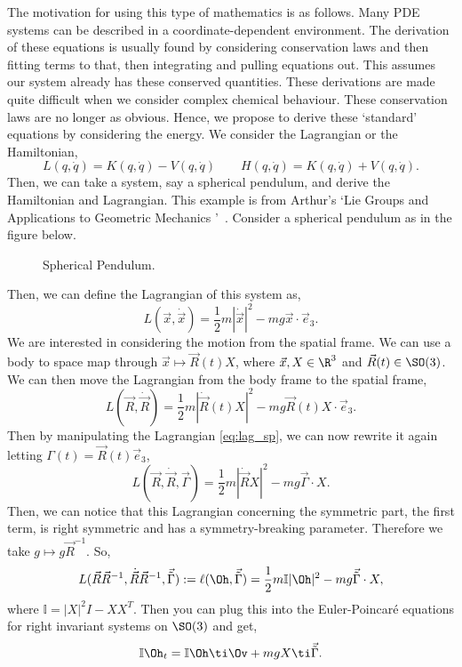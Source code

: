 \noindent
The motivation for using this type of mathematics is as follows. Many PDE systems can be described in a coordinate-dependent environment. The derivation of these equations is usually found by considering conservation laws and then fitting terms to that, then integrating and pulling equations out. This assumes our system already has these conserved quantities. These derivations are made quite difficult when we consider complex chemical behaviour. These conservation laws are no longer as obvious. Hence, we propose to derive these `standard' equations by considering the energy. We consider the Lagrangian or the Hamiltonian,
$$ L(q, \dot q) = K(q, \dot q) - V(q, \dot q) \qquad H(q, \dot q) = K(q, \dot q) + V(q, \dot q). $$
Then, we can take a system, say a spherical pendulum, and derive the Hamiltonian and Lagrangian. This example is from Arthur's `Lie Groups and Applications to Geometric Mechanics '~\cite {arthur}. Consider a spherical pendulum as in the figure below.

\begin{figure}[!ht]
\centering
\resizebox{0.6\textwidth}{!}{}
\caption{Spherical Pendulum.}
\label{fig:diffeos}
\end{figure}

\noindent
Then, we can define the Lagrangian of this system as,
$$ L(\vec x, \dot{\vec x}) = \frac{1}{2}m|\dot {\vec x}|^2 - mg \vec x \cdot \vec e_3. $$
We are interested in considering the motion from the spatial frame. We can use a body to space map through $\vec x \mapsto \vec R(t)X$, where $\vec x, X \in \R^3$ and $\vec R(t) \in \SO(3)$. We can then move the Lagrangian from the body frame to the spatial frame,
\begin{equation}
  L(\vec R, \dot{\vec R}) = \frac{1}{2}m|\dot{\vec R}(t)X|^2 - mg \vec R(t)X \cdot \vec e_3.\label{eq:lag_sp}
\end{equation}
Then by manipulating the Lagrangian \eqref{eq:lag_sp}, we can now rewrite it again letting $\Gamma (t) = \vec R(t)\vec e_3$,
$$ L(\vec R, \dot{\vec R}, \vec\Gamma) = \frac{1}{2}m |\dot{\vec R}X|^2 - mg\vec\Gamma \cdot X. $$
Then, we can notice that this Lagrangian concerning the symmetric part, the first term, is right symmetric and has a symmetry-breaking parameter. Therefore we take $g \mapsto g\vec R^{-1}$. So,
$$ L(\vec R\vec R^{-1}, \dot{\vec R}\vec R^{-1}, \vec{\tilde{\Gamma}}) := \ell(\Oh, \vec{\tilde{\Gamma}}) = \frac{1}{2}m \mathbb{I} |\Oh|^2 - mg\vec{\tilde{\Gamma}} \cdot X, $$
where $\mathbb{I} = |X|^2I - XX^T$. Then you can plug this into the Euler-Poincar\'e equations for right invariant systems on $\SO(3)$ and get,
$$ \mathbb{I}\Oh_t = \mathbb{I}\Oh  \ti \Ov + mg X \ti \vec{\tilde{\Gamma}}. $$


